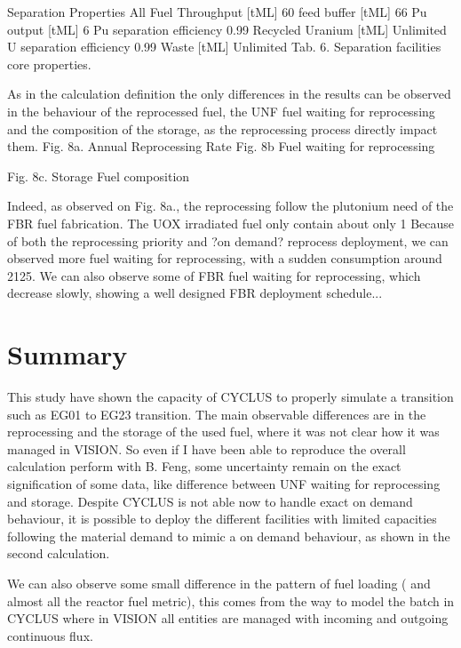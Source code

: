 \documentclass[12pt]{article}
\begin{document}
Separation Properties
All Fuel 
Throughput [tML]
60
feed buffer [tML]
66
Pu output  [tML]
6
Pu separation efficiency
0.99
Recycled Uranium [tML]
Unlimited
U separation efficiency
0.99
Waste [tML]
Unlimited
Tab. 6. Separation facilities core properties.


As in the calculation definition the only differences in the results can be observed in the behaviour of the reprocessed fuel, the UNF fuel waiting for reprocessing and the composition of the storage, as the reprocessing process directly impact them.
Fig. 8a. Annual Reprocessing Rate				Fig. 8b Fuel waiting for reprocessing

Fig. 8c. Storage Fuel composition

Indeed, as observed on Fig. 8a., the reprocessing follow the plutonium need of the FBR fuel fabrication. The UOX irradiated fuel only contain about only 1 %
Because of both the reprocessing priority and ?on demand? reprocess deployment, we can observed more fuel waiting for reprocessing, with a sudden consumption around 2125. We can also observe some of FBR fuel waiting for reprocessing, which decrease slowly, showing a well designed FBR deployment schedule...
\section{Summary}
This study have shown the capacity of CYCLUS to properly simulate a transition such as EG01 to EG23 transition.
The main observable differences are in the reprocessing and the storage of the used fuel, where it was not clear how it was managed in VISION. So even if I have been able to reproduce the overall calculation perform with B. Feng, some uncertainty remain on the exact signification of some data, like difference between UNF waiting for reprocessing and storage.
Despite CYCLUS is not able now to handle exact on demand behaviour, it is possible to deploy the different facilities with limited capacities following the material demand to mimic a on demand behaviour, as shown in the second calculation.

We can also observe some small difference in the pattern of fuel loading ( and almost all the reactor fuel metric), this comes from the way to model the batch in CYCLUS where in VISION all entities are managed with incoming and outgoing continuous flux.










\end{document}
